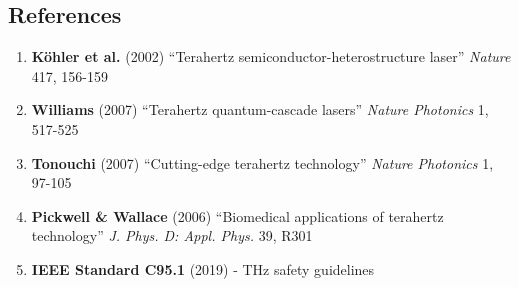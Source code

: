 \subsection{References}\label{references}

\begin{enumerate}
\def\labelenumi{\arabic{enumi}.}
\tightlist
\item
  \textbf{Köhler et al.} (2002) ``Terahertz
  semiconductor-heterostructure laser'' \emph{Nature} 417, 156-159
\item
  \textbf{Williams} (2007) ``Terahertz quantum-cascade lasers''
  \emph{Nature Photonics} 1, 517-525
\item
  \textbf{Tonouchi} (2007) ``Cutting-edge terahertz technology''
  \emph{Nature Photonics} 1, 97-105
\item
  \textbf{Pickwell \& Wallace} (2006) ``Biomedical applications of
  terahertz technology'' \emph{J. Phys. D: Appl. Phys.} 39, R301
\item
  \textbf{IEEE Standard C95.1} (2019) - THz safety guidelines
\end{enumerate}
